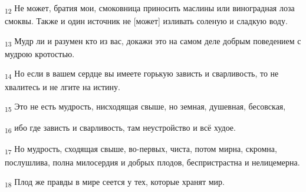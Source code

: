 \begin{tcolorbox}
\textsubscript{12} Не может, братия мои, смоковница приносить маслины или виноградная лоза смоквы. Также и один источник не [может] изливать соленую и сладкую воду.
\end{tcolorbox}
\begin{tcolorbox}
\textsubscript{13} Мудр ли и разумен кто из вас, докажи это на самом деле добрым поведением с мудрою кротостью.
\end{tcolorbox}
\begin{tcolorbox}
\textsubscript{14} Но если в вашем сердце вы имеете горькую зависть и сварливость, то не хвалитесь и не лгите на истину.
\end{tcolorbox}
\begin{tcolorbox}
\textsubscript{15} Это не есть мудрость, нисходящая свыше, но земная, душевная, бесовская,
\end{tcolorbox}
\begin{tcolorbox}
\textsubscript{16} ибо где зависть и сварливость, там неустройство и всё худое.
\end{tcolorbox}
\begin{tcolorbox}
\textsubscript{17} Но мудрость, сходящая свыше, во-первых, чиста, потом мирна, скромна, послушлива, полна милосердия и добрых плодов, беспристрастна и нелицемерна.
\end{tcolorbox}
\begin{tcolorbox}
\textsubscript{18} Плод же правды в мире сеется у тех, которые хранят мир.
\end{tcolorbox}
